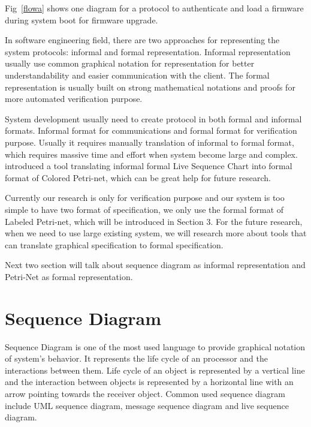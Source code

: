 \documentclass[12pt,frontmatter,copyright,thesis]{usfmanus}
\begin{document}
Fig~\ref{flowa} shows one diagram for a protocol
to authenticate and load a firmware during system boot for
firmware upgrade.  


 
 In software engineering field, there are two approaches for representing the system protocols: informal
 and formal representation.
  Informal representation usually use common 
  graphical notation for representation for better understandability and easier communication with the client. 
The formal representation is usually built on strong mathematical notations and proofs for
more automated verification purpose.

System development usually need to create protocol in both formal and informal formats. 
Informal format for communications and formal format for verification purpose. 
Usually it requires manually translation of informal to formal format, which 
requires massive time and effort when system become large and complex. 
 ~\cite{LCSTOCPN} introduced a tool translating informal formal Live Sequence Chart
 into formal format of Colored Petri-net, which can be great help for future research.
 
 Currently our research is only for verification purpose and our system is too simple
 to have two format of specification, we only use the formal format of Labeled Petri-net,
  which will be introduced in Section 3.
  For the future research, when we need to use large existing system, we will 
  research more about tools that can translate graphical specification to formal specification.

Next two section will talk about sequence diagram as informal representation and Petri-Net as formal representation.


\section{Sequence Diagram}
Sequence Diagram is one of the most used language to provide 
graphical notation of system's behavior.
It represents the
 life cycle of an processor and the interactions between them.
 Life cycle of an object is represented by a vertical line
  and the interaction between objects is represented by 
  a horizontal line with an arrow pointing towards the receiver object.
Common used sequence diagram include UML sequence diagram, message sequence 
diagram and live sequence diagram.~\cite{LSCTOCPN}
 
\end{document}
